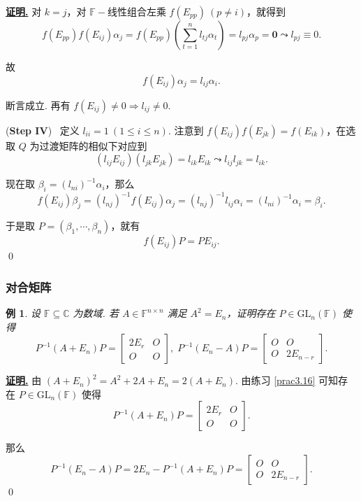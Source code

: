 \documentclass[10pt,openany]{article}
\theoremstyle{thmstyle} %
\theoremstyle{defstyle} %
\theoremstyle{prostyle} %
\theoremstyle{exastyle}
\newtheorem{example}[theorem]{例}
\theoremstyle{remstyle}
\renewenvironment{proof}[1][证明]{\par\underline{\textbf{#1.}} \;\fangsong}{\qed\par}
\newcommand{\F}{\mathbb{F}}
\newcommand{\gfn}{\text{GL}_n(\mathbb{F})}
\newcommand{\C}{\mathbb{C}}
\newcommand{\n}{^{n \times n}}
\begin{document}
\begin{proof}
    对 \( k=j \)，对 \( \F-\)线性组合左乘 \( f(E_{pp}) \ (p \neq i) \)，就得到
    \[ f(E_{pp})f(E_{ij})\alpha_j=f(E_{pp}) \left( \sum_{t=1}^{n} l_{tj} \alpha_t \right)=l_{pj} \alpha_p=\bm{0} \leadsto l_{pj} \equiv 0. \]
    
    故
    \[ f(E_{ij})\alpha_j= l_{ij} \alpha_i. \]
    
    断言成立. 再有 \( f(E_{ij}) \neq 0 \Rightarrow l_{ij} \neq 0 \).
    
    (\textbf{Step IV}) \ 定义 \( l_{ii}=1 \ (1 \leq i \leq n) \). 注意到 \( f(E_{ij})f(E_{jk})=f(E_{ik}) \)，在选取 \( Q \) 为过渡矩阵的相似下对应到 
    \[ (l_{ij} E_{ij})(l_{jk} E_{jk})= l_{ik} E_{ik} \leadsto l_{ij}l_{jk}=l_{ik}. \]
    
    现在取 \( \beta_i= (l_{ni})^{-1} \alpha_i \)，那么
    \[ f(E_{ij}) \beta_j= (l_{nj})^{-1} f(E_{ij}) \alpha_j = (l_{nj})^{-1} l_{ij} \alpha_i= (l_{ni})^{-1} \alpha_i= \beta_i. \]
    
    于是取 \( P=(\beta_1,\cdots,\beta_n) \)，就有 
    \[ f(E_{ij})P=PE_{ij}. \]
\end{proof}


\subsubsection{对合矩阵}

\begin{example} \label{3.4.14}
	设 \( \F \subseteq \C \) 为数域. 若 \( A \in \F\n \) 满足 \( A^2=E_n \)，证明存在 \( P \in \gfn \) 使得
	\[ P^{-1}(A+E_n)P=\begin{bmatrix}
		2E_r & O \\
		O & O
	\end{bmatrix}, \; P^{-1}(E_n-A)P=\begin{bmatrix}
	O & O \\
	O & 2E_{n-r}
	\end{bmatrix}. \]
\end{example}

\begin{proof}
    由 \( (A+E_n)^2=A^2+2A+E_n=2(A+E_n) \). 由练习 \ref{prac3.16} 可知存在 \( P \in \gfn  \) 使得
    \[ P^{-1}(A+E_n)P=\begin{bmatrix}
    	2E_r & O \\
    	O & O
    \end{bmatrix}. \]
    
    那么
    \[ P^{-1}(E_n-A)P=2E_n-P^{-1}(A+E_n)P=\begin{bmatrix}
    	O & O \\
    	O & 2E_{n-r}
    \end{bmatrix}. \]
\end{proof}
\end{document}
